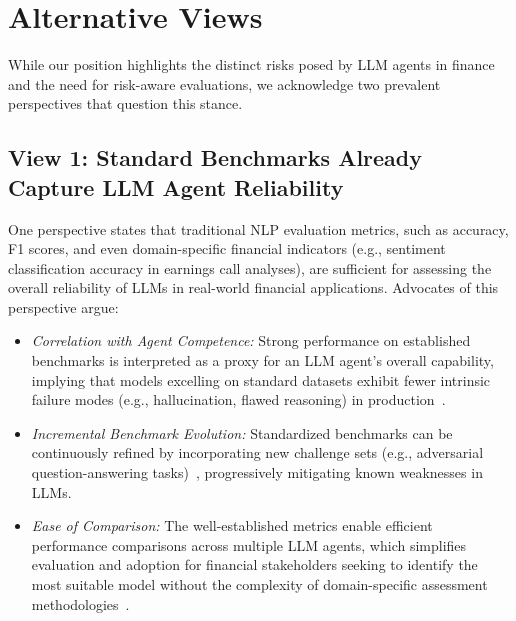 \section{Alternative Views}
\label{sec:alt-views}

While our position highlights the distinct risks posed by LLM agents in finance and the need for risk-aware evaluations, we acknowledge two prevalent perspectives that question this stance. 

\subsection{View 1: Standard Benchmarks Already Capture LLM Agent Reliability}

One perspective states that traditional NLP evaluation metrics, such as accuracy, F1 scores, and even domain-specific financial indicators (e.g., sentiment classification accuracy in earnings call analyses), are sufficient for assessing the overall reliability of LLMs in real-world financial applications.
Advocates of this perspective argue:
\begin{itemize}
    \item \emph{Correlation with Agent Competence:} 
    Strong performance on established benchmarks is interpreted as a proxy for an LLM agent's overall capability, implying that models excelling on standard datasets exhibit fewer intrinsic failure modes (e.g., hallucination, flawed reasoning) in production~\citep{xiao2025tradingagentsmultiagentsllmfinancial,wu2023bloomberggpt}.
    
    \item \emph{Incremental Benchmark Evolution:} Standardized benchmarks can be continuously refined by incorporating new challenge sets (e.g., adversarial question-answering tasks)~\citep{xie2024finben,islam2023financebench}, progressively mitigating known weaknesses in LLMs.

    \item \emph{Ease of Comparison:} 
    The well-established metrics enable efficient performance comparisons across multiple LLM agents, which simplifies evaluation and adoption for financial stakeholders seeking to identify the most suitable model without the complexity of domain-specific assessment methodologies~\citep{xie2024pixiu,li2024investorbenchbenchmarkfinancialdecisionmaking,xie2024finben}.
    \end{itemize}

